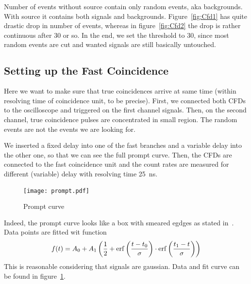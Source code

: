 Number of events without source contain only random events, aka backgrounds. With source it contains both signals and backgrounds. Figure~\ref{fig:Cfd1} has quite drastic drop in number of events, whereas in figure~\ref{fig:Cfd2} the drop is rather continuous after \num{30} or so. In the end, we set the threshold to \num{30}, since most random events are cut and wanted signals are still basically untouched.

\subsection{Setting up the Fast Coincidence}
Here we want to make sure that true coincidences arrive at same time (within resolving time of coincidence unit, to be precise). First, we connected both CFDs to the oscilloscope and triggered on the first channel signals. Then, on the second channel, true coincidence pulses are concentrated in small region. The random events are not the events we are looking for. 

We inserted a fixed delay into one of the fast branches and a variable delay into the other one, so that we can see the full prompt curve. Then, the CFDs are connected to the fast coincidence unit and the count rates are measured for different (variable) delay with resolving time \SI{25}{\nano\s}. 

\begin{figure}[H]
   \centering
   \texttt{[image: prompt.pdf]}
   \caption{Prompt curve}%
   \label{fig:prompt}
\end{figure}
Indeed, the prompt curve looks like a box with smeared egdges as stated in~\cite{descr}. Data points are fitted wit function
\begin{equation}
   f(t) = A_0 + A_1 \left( \frac{1}{2} + \erf \left(\frac{t-t_0}{\sigma} \right) \cdot \erf \left(\frac{t_1 - t}{\sigma} \right) \right)
\end{equation}
This is reasonable considering that signals are gaussian. Data and fit curve can be found in figure~\ref{fig:prompt}.


